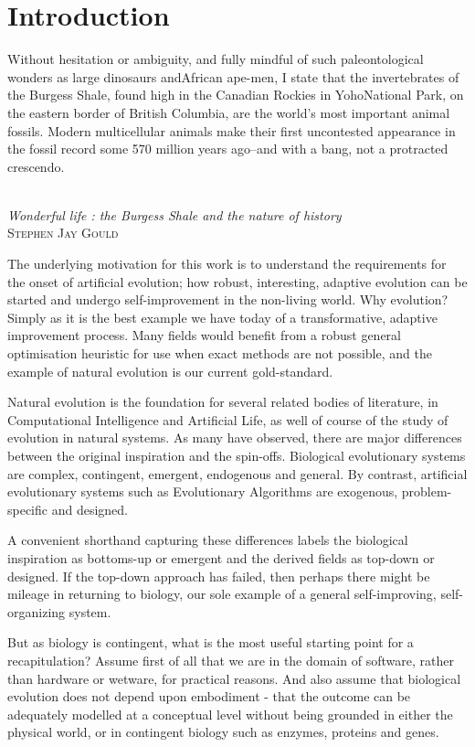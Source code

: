 \chapter{Introduction}\label{introduction}

\settowidth{\epigraphwidth}{Wonderful life : the Burgess Shale and the nature of history}
\epigraph{%
Without hesitation or ambiguity, and fully mindful of such paleontological wonders as large dinosaurs andAfrican ape-men, I state that the invertebrates of the Burgess Shale, found high in the Canadian Rockies in YohoNational Park, on the eastern border of British Columbia, are the world's most important animal fossils. Modern multicellular animals make their first uncontested appearance in the fossil record some 570 million years ago--and with a bang, not a protracted crescendo.}%
{\textit{\\Wonderful life : the Burgess Shale and the nature of history}\\\textsc{Stephen Jay Gould}}

The underlying motivation for this work is to understand the requirements for the onset of artificial evolution; how robust, interesting, adaptive evolution can be started and undergo self-improvement in the non-living world. Why evolution? Simply as it is the best example we have today of a transformative, adaptive improvement process. Many fields would benefit from a robust general optimisation heuristic for use when exact methods are not possible, and the example of natural evolution is our current gold-standard. 

Natural evolution is the foundation for several related bodies of literature, in Computational Intelligence and Artificial Life, as well of course of the study of evolution in natural systems. As many have observed, there are major differences between the original inspiration and the spin-offs. Biological evolutionary systems are complex, contingent, emergent, endogenous and general. By contrast, artificial evolutionary systems such as Evolutionary Algorithms are exogenous, problem-specific and designed.

A convenient shorthand capturing these differences labels the biological inspiration as bottoms-up or emergent and the derived fields as top-down or designed. If the top-down approach has failed, then perhaps there might be mileage in returning to biology, our sole example of a general self-improving, self-organizing system.

But as biology is contingent, what is the most useful starting point for a recapitulation? Assume first of all that we are in the domain of software, rather than hardware or wetware, for practical reasons. And also assume that biological evolution does not depend upon embodiment - that the outcome can be adequately modelled at a conceptual level without being grounded in either the physical world, or in contingent biology such as enzymes, proteins and genes.


